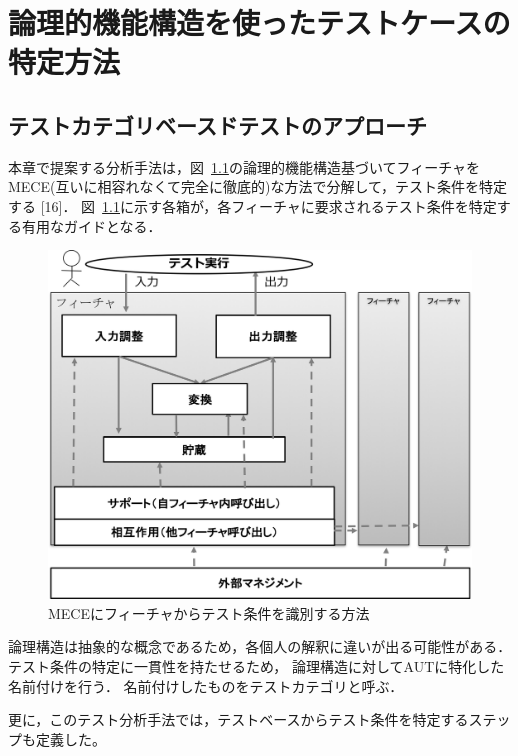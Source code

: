 \documentclass[a4paper,12pt]{jreport}
\begin{document}
\chapter{論理的機能構造を使ったテストケースの特定方法}


\section{テストカテゴリベースドテストのアプローチ}
本章で提案する分析手法は，図~\ref{fig:D-3-Fig3}の論理的機能構造基づいてフィーチャをMECE(互いに相容れなくて完全に徹底的)な方法で分解して，テスト条件を特定する [16]．
図~\ref{fig:D-3-Fig3}に示す各箱が，各フィーチャに要求されるテスト条件を特定する有用なガイドとなる．
\begin{figure}[h]
  \begin{center}
  \includegraphics[width=12cm]{./image/D-3-Fig3.png}
  \caption{MECEにフィーチャからテスト条件を識別する方法}
  \label{fig:D-3-Fig3}
  \end{center}
   \end{figure}

論理構造は抽象的な概念であるため，各個人の解釈に違いが出る可能性がある．テスト条件の特定に一貫性を持たせるため， 論理構造に対してAUTに特化した名前付けを行う．
名前付けしたものをテストカテゴリと呼ぶ．

更に，このテスト分析手法では，テストベースからテスト条件を特定するステップも定義した。
\end{document}
